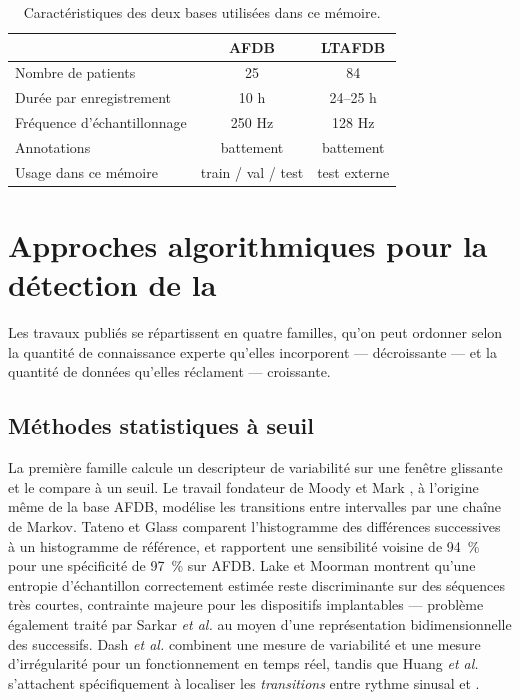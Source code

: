 \begin{table}[H]
  \centering
  \caption{Caractéristiques des deux bases utilisées dans ce mémoire.}
  \label{tab:soa:datasets}
  \begin{tabular}{lcc}
    \toprule
    & \textbf{AFDB} & \textbf{LTAFDB} \\
    \midrule
    Nombre de patients          & 25 & 84 \\
    Durée par enregistrement    & 10 h & 24--25 h \\
    Fréquence d'échantillonnage & 250 Hz & 128 Hz \\
    Annotations                 & battement & battement \\
    Usage dans ce mémoire       & train / val / test & test externe \\
    \bottomrule
  \end{tabular}
\end{table}

\section{Approches algorithmiques pour la détection de la \FA{}}
\label{sec:soa:approches}

Les travaux publiés se répartissent en quatre familles, qu'on peut ordonner selon la quantité de connaissance experte qu'elles incorporent — décroissante — et la quantité de données qu'elles réclament — croissante.

\subsection{Méthodes statistiques à seuil}
La première famille calcule un descripteur de variabilité sur une fenêtre glissante et le compare à un seuil. Le travail fondateur de Moody et Mark \cite{moody1983new}, à l'origine même de la base AFDB, modélise les transitions entre intervalles \RR{} par une chaîne de Markov. Tateno et Glass \cite{tateno2001automatic} comparent l'histogramme des différences successives à un histogramme de référence, et rapportent une sensibilité voisine de 94~\% pour une spécificité de 97~\% sur AFDB. Lake et Moorman \cite{lake2011accurate} montrent qu'une entropie d'échantillon correctement estimée reste discriminante sur des séquences très courtes, contrainte majeure pour les dispositifs implantables — problème également traité par Sarkar \textit{et al.} \cite{sarkar2008detector} au moyen d'une représentation bidimensionnelle des \RR{} successifs. Dash \textit{et al.} \cite{dash2009automatic} combinent une mesure de variabilité et une mesure d'irrégularité pour un fonctionnement en temps réel, tandis que Huang \textit{et al.} \cite{huang2011novel} s'attachent spécifiquement à localiser les \emph{transitions} entre rythme sinusal et \FA{}.

